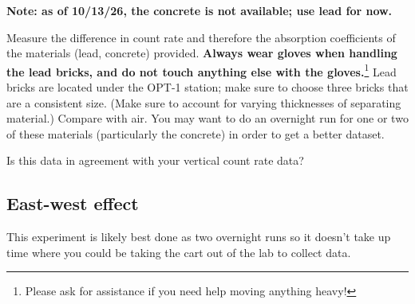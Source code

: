 \documentclass{../lab}
\begin{document}

\textbf{Note: as of 10/13/26, the concrete is not available; use lead for now.}

Measure the difference in count rate and therefore the absorption coefficients of the materials (lead, concrete) provided. \textbf{Always wear gloves when handling the lead bricks, and do not touch anything else with the gloves.}\footnote{Please ask for assistance if you need help moving anything heavy!} Lead bricks are located under the OPT-1 station; make sure to choose three bricks that are a consistent size. (Make sure to account for varying thicknesses of separating material.) Compare with air. You may want to do an overnight run for one or two of these materials (particularly the concrete) in order to get a better dataset.


Is this data in agreement with your vertical count rate data?





\subsection{East-west effect}

This experiment is likely best done as two overnight runs so it doesn't take up time where you could be taking the cart out of the lab to collect data.
\end{document}
